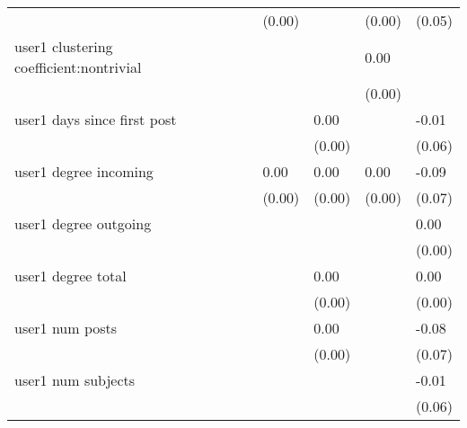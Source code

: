 \begin{table*}
\begin{center}
\begin{tabular}{llllllll}
                                               &          &            &         & (0.00)  &          & (0.00)             & (0.05)   \\
user1 clustering coefficient:nontrivial        &          &            &         &         &          & 0.00               &          \\
                                               &          &            &         &         &          & (0.00)             &          \\
user1 days since first post                    &          &            &         &         & 0.00     &                    & -0.01    \\
                                               &          &            &         &         & (0.00)   &                    & (0.06)   \\
user1 degree incoming                          &          &            &         & 0.00    & 0.00     & 0.00               & -0.09    \\
                                               &          &            &         & (0.00)  & (0.00)   & (0.00)             & (0.07)   \\
user1 degree outgoing                          &          &            &         &         &          &                    & 0.00     \\
                                               &          &            &         &         &          &                    & (0.00)   \\
user1 degree total                             &          &            &         &         & 0.00     &                    & 0.00     \\
                                               &          &            &         &         & (0.00)   &                    & (0.00)   \\
user1 num posts                                &          &            &         &         & 0.00     &                    & -0.08    \\
                                               &          &            &         &         & (0.00)   &                    & (0.07)   \\
user1 num subjects                             &          &            &         &         &          &                    & -0.01    \\
                                               &          &            &         &         &          &                    & (0.06)   \\

\end{tabular}
\end{center}
\end{table*}
